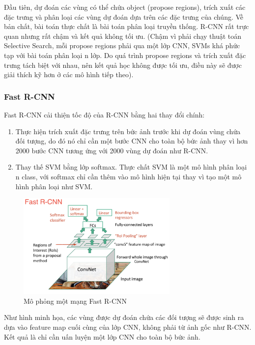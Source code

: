 \documentclass[a4paper]{report}
\begin{document}
Đầu tiên, dự đoán các vùng có thể chứa object (propose regions), trích xuất các đặc trưng
và phân loại các vùng dự đoán dựa trên các đặc trưng của chúng. Về bản chất, bài toán thực
chất là bài toán phân loại truyền thống. R-CNN rất trực quan nhưng rất chậm và kết quả 
không tối ưu. (Chậm vì phải chạy thuật toán Selective Search, mỗi propose regions phải 
qua một lớp CNN, SVMs khá phức tạp với bài toán phân loại n lớp. Do quá trình propose 
regions và trích xuất đặc trưng tách biệt với nhau, nên kết quả học không được tối ưu, 
điều này sẽ được giải thích kỹ hơn ở các mô hình tiếp theo).

\subsubsection{Fast R-CNN}
Fast R-CNN cải thiện tốc độ của R-CNN bằng hai thay đổi chính:

\begin{enumerate}
	\item Thực hiện trích xuất đặc trưng trên bức ảnh trước khi dự đoán vùng chứa đối tượng, 
do đó nó chỉ cần một bước CNN cho toàn bộ bức ảnh thay vì hơn 2000 bước CNN tương ứng với 2000 vùng dự đoán như R-CNN.
	\item  Thay thế SVM bằng lớp softmax. Thực chất SVM là một mô hình phân loại n class, 
với softmax chỉ cần thêm vào mô hình hiện tại thay vì tạo một mô hình phân loại như SVM.   
\end{enumerate}

\begin{figure}[h!]
	\centering
	\includegraphics[width=0.7\textwidth]{2_fast.png}
	\caption{Mô phỏng một mạng Fast R-CNN \cite{detectionoverview}}
\end{figure}

Như hình minh họa, các vùng được dự đoán chứa các đối tượng sẽ được sinh ra dựa vào 
feature map cuối cùng của lớp CNN, không phải từ ảnh gốc như R-CNN. Kết quả là chỉ cần 
uấn luyện một lớp CNN cho toàn bộ bức ảnh. \\
\end{document}
